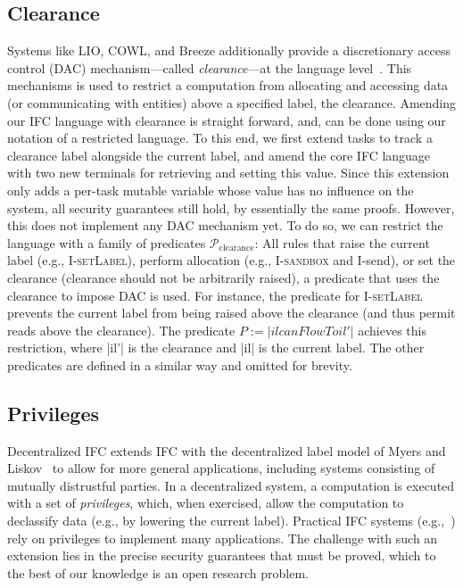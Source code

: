 \subsection{Clearance}
\label{sec:clearance}
%
Systems like LIO, COWL, and Breeze additionally provide a discretionary access
control (DAC) mechanism---called \emph{clearance}---at the language
level~\cite{Hritcu:2013:YIB:2497621.2498098, lio}.
%
This mechanisms is used to restrict a computation from allocating and
accessing data (or communicating with entities) above a specified
label, the clearance.
%
Amending our IFC language with clearance is straight forward,
and, can be done using our notation of a restricted language.
%
To this end, we first extend tasks to track a clearance label
alongside the current label, and amend the core IFC language with two
new terminals for retrieving and setting this value.
%
Since this extension only adds a per-task mutable variable whose value
has no influence on the system, all security guarantees still
hold, by essentially the same proofs.
%
However, this does not implement any DAC mechanism yet.
%
To do so, we can restrict the language with a family of predicates
$\mathcal{P}_\text{clearance}$:
All rules that
raise the current label (e.g., \textsc{I-setLabel}), perform
allocation (e.g., \textsc{I-sandbox} and \textsf{I-send}), or set the
clearance (clearance should not be arbitrarily raised), a predicate
that uses the clearance to impose DAC is used.
%
For instance, the predicate for \textsc{I-setLabel} prevents the
current label from being raised above the clearance (and thus permit
reads above the clearance).  The predicate $P := |il
canFlowTo il'|$ achieves this restriction, where |il'| is the
clearance and |il| is the current
label.
%
The other predicates are defined in a similar way and omitted for
brevity.


\subsection{Privileges}
Decentralized IFC extends IFC with the decentralized label model of
Myers and Liskov~\cite{myers:dlm} to allow for more general
applications, including systems consisting of mutually distrustful
parties.  In a decentralized system, a computation is executed with a
set of \emph{privileges}, which, when exercised, allow the computation
to declassify data (e.g., by lowering the current label).
%
Practical IFC systems
(e.g.,~\cite{Zeldovich:2006, lio,
  Hritcu:2013:YIB:2497621.2498098, myers:jif}) rely on privileges to
implement many applications.
%
%
The challenge with such an extension lies in the precise
security guarantees that must be proved, which to the best of our
knowledge is an open research problem.

